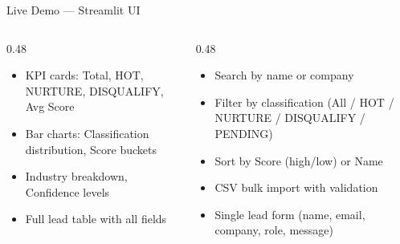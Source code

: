 \documentclass[aspectratio=169,10pt]{beamer}
\begin{document}
\begin{frame}{Live Demo — Streamlit UI}
\centering
{}

\vspace{6pt}
\begin{columns}[T]
\begin{column}{0.48\textwidth}
  \begin{tcolorbox}[colback=cardbg,colframe=cardborder,arc=3mm,fonttitle=\scriptsize\bfseries,
    title={\faChartBar\; Dashboard}]
    \scriptsize
    \begin{itemize}\setlength\itemsep{2pt}
      \item KPI cards: Total, HOT, NURTURE, DISQUALIFY, Avg Score
      \item Bar charts: Classification distribution, Score buckets
      \item Industry breakdown, Confidence levels
      \item Full lead table with all fields
    \end{itemize}
  \end{tcolorbox}
\end{column}
\begin{column}{0.48\textwidth}
  \begin{tcolorbox}[colback=cardbg,colframe=cardborder,arc=3mm,fonttitle=\scriptsize\bfseries,
    title={\faInbox\; Inbox}]
    \scriptsize
    \begin{itemize}\setlength\itemsep{2pt}
      \item Search by name or company
      \item Filter by classification (All / HOT / NURTURE / DISQUALIFY / PENDING)
      \item Sort by Score (high/low) or Name
      \item CSV bulk import with validation
      \item Single lead form (name, email, company, role, message)
    \end{itemize}
  \end{tcolorbox}
\end{column}
\end{columns}


\end{frame}
\end{document}

